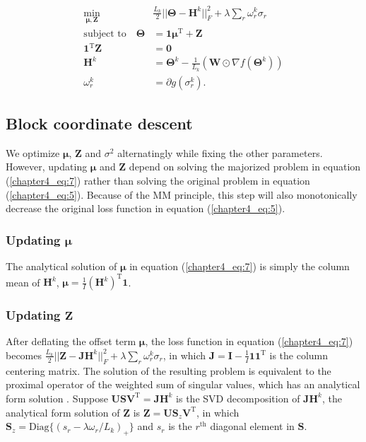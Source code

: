 \begin{equation}\label{chapter4_eq:7}
\begin{aligned}
\min_{\bm{\mu},\mathbf{Z}} \quad & \frac{L_k}{2}||\mathbf{\Theta}-\mathbf{H}^{k}||_F^2 + \lambda \sum_{r} \omega_r^k\sigma_{r}\\
           \text{subject to} \quad   \mathbf{\Theta} &= \mathbf{1}\bm{\mu}^{\text{T}} + \mathbf{Z}\\
                               \mathbf{1}^{\text{T}}\mathbf{Z} &= \mathbf{0} \\
                               \mathbf{H}^k &= \mathbf{\Theta}^k - \frac{1}{L_k} (\mathbf{W}\odot \nabla f(\mathbf{\Theta}^k)) \\
                               \omega_r^k &= \partial g(\sigma_r^k).
\end{aligned}
\end{equation}

\subsection{Block coordinate descent}
We optimize $\bm{\mu}$, $\mathbf{Z}$ and $\sigma^2$ alternatingly while fixing the other parameters. However, updating $\bm{\mu}$ and $\mathbf{Z}$ depend on solving the majorized problem in equation (\ref{chapter4_eq:7}) rather than solving the original problem in equation (\ref{chapter4_eq:5}). Because of the MM principle, this step will also monotonically decrease the original loss function in equation (\ref{chapter4_eq:5}).

\subsubsection*{Updating $\bm{\mu}$}
The analytical solution of $\bm{\mu}$ in equation (\ref{chapter4_eq:7}) is simply the column mean of $\mathbf{H}^k$, $\bm{\mu} = \frac{1}{I} (\mathbf{H}^k)^{\text{T}} \mathbf{1}$.

\subsubsection*{Updating $\mathbf{Z}$}
After deflating the offset term $\bm{\mu}$, the loss function in equation (\ref{chapter4_eq:7}) becomes $\frac{L_k}{2} ||\mathbf{Z} - \mathbf{J} \mathbf{H}^k||_F^2 + \lambda \sum_{r}\omega_{r}^k \sigma_r$, in which $\mathbf{J} = \mathbf{I} - \frac{1}{I} \mathbf{1} \mathbf{1}^{\text{T}}$ is the column centering matrix. The solution of the resulting problem is equivalent to the proximal operator of the weighted sum of singular values, which has an analytical form solution \cite{lu2015generalized}. Suppose $\mathbf{USV}^{\text{T}} = \mathbf{J} \mathbf{H}^k$ is the SVD decomposition of $\mathbf{J} \mathbf{H}^k$, the analytical form solution of $\mathbf{Z}$ is $\mathbf{Z} = \mathbf{US}_{z}\mathbf{V}^{\text{T}}$, in which $\mathbf{S}_{z} = \text{Diag}\{(s_{r}-\lambda \omega_r /L_k)_{+}\}$ and $s_{r}$ is the $r^{\text{th}}$ diagonal element in $\mathbf{S}$.

